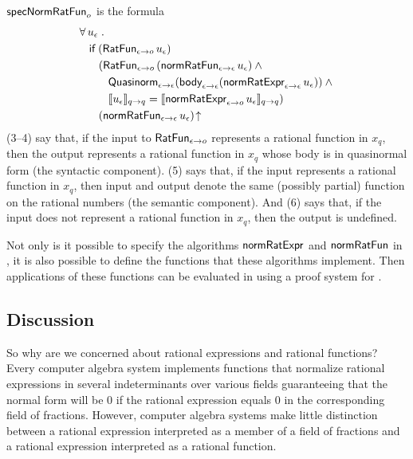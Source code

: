 \documentclass[fleqn]{llncs}
\begin{document}
$\mbox{\sf specNormRatFun}_o$ is the formula
\begin{align}\label{specNormRatFun}\setcounter{equation}{0}
&
\ForallApp u_\epsilon \mdot\\
& \hspace*{2ex}
\If \; (\mname{RatFun}_{\epsilon \tarrow o} \, u_\epsilon)\\
& \hspace*{4ex}
(\mname{RatFun}_{\epsilon \tarrow o} \, (\mname{normRatFun}_{\epsilon \tarrow \epsilon} \, u_\epsilon) \And {}\\
& \hspace*{6ex}
\mname{Quasinorm}_{\epsilon \tarrow \epsilon}(\mname{body}_{\epsilon \tarrow \epsilon}(\mname{normRatExpr}_{\epsilon \tarrow \epsilon} \, u_\epsilon)) \And {}\\
& \hspace*{6ex}
\sembrack{u_\epsilon}_{q \tarrow q} =
\sembrack{\mname{normRatExpr}_{\epsilon \tarrow o} \, u_\epsilon}_{q \tarrow q})\\
& \hspace*{4ex}
(\mname{normRatFun}_{\epsilon \tarrow \epsilon} \, u_\epsilon)\IsUndefApp
\end{align}
(3--4) say that, if the input to $\mbox{\sf RatFun}_{\epsilon \rightarrow o}$
represents a rational function in $x_q$, then the output represents a
rational function in $x_q$ whose body is in quasinormal form (the
syntactic component).  (5) says that, if the input represents a
rational function in $x_q$, then input and output denote the same
(possibly partial) function on the rational numbers (the semantic
component).  And (6) says that, if the input does not represent a
rational function in $x_q$, then the output is undefined.

Not only is it possible to specify the algorithms
$\mbox{\sf normRatExpr}$ and $\mbox{\sf normRatFun}$ in {\churchuqe}, it is
also possible to define the functions that these algorithms implement.
Then applications of these functions can be evaluated in {\churchuqe}
using a proof system for {\churchuqe}.

\subsection{Discussion}

So why are we concerned about rational expressions and rational
functions?  Every computer algebra system implements functions that
normalize rational expressions in several indeterminants over various
fields guaranteeing that the normal form will be 0 if the rational
expression equals 0 in the corresponding field of fractions.  However,
computer algebra systems make little distinction between a rational
expression interpreted as a member of a field of fractions and a
rational expression interpreted as a rational function.
\end{document}
